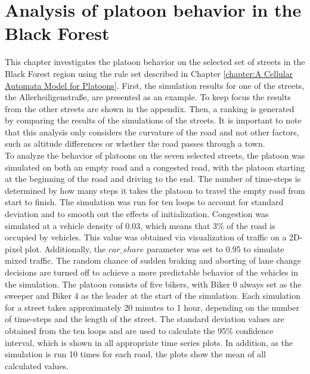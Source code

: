 \chapter{Analysis of platoon behavior in the Black Forest}
\label{chapter:Analysis of platoon behaviour in the Black Forest}
This chapter investigates the platoon behavior on the selected set of streets in the Black Forest region using the rule set described in Chapter \ref{chapter:A Cellular Automata Model for Platoons}. First, the simulation results for one of the streets, the Allerheiligenstraße, are presented as an example. To keep focus the results from the other streets are shown in the appendix. Then, a ranking is generated by comparing the results of the simulations of the streets. It is important to note that this analysis only considers the curvature of the road and not other factors, such as altitude differences or whether the road passes through a town.\\

To analyze the behavior of platoons on the seven selected streets, the platoon was simulated on both an empty road and a congested road, with the platoon starting at the beginning of the road and driving to the end. The number of time-steps is determined by how many steps it takes the platoon to travel the empty road from start to finish. The simulation was run for ten loops to account for standard deviation and to smooth out the effects of initialization. Congestion was simulated at a vehicle density of 0.03, which means that 3\% of the road is occupied by vehicles. This value was obtained via visualization of traffic on a 2D-pixel plot. Additionally, the $car\_share$ parameter was set to 0.95 to simulate mixed traffic. The random chance of sudden braking and aborting of lane change decisions are turned off to achieve a more predictable behavior of the vehicles in the simulation. The platoon consists of five bikers, with Biker 0 always set as the sweeper and Biker 4 as the leader at the start of the simulation. Each simulation for a street takes approximately 20 minutes to 1 hour, depending on the number of time-steps and the length of the street. The standard deviation values are obtained from the ten loops and are used to calculate the 95\% confidence interval, which is shown in all appropriate time series plots. In addition, as the simulation is run 10 times for each road, the plots show the mean of all calculated values.\\


